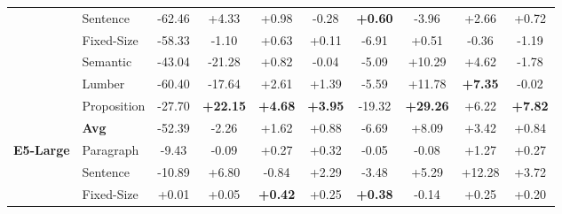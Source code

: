 \begin{table}[htbp]
\begin{tabular}{llcccccccc}
		& Sentence & \cellcolor{lightred}-62.46 & \cellcolor{lightgreen}+4.33 & \cellcolor{lightgreen}+0.98 & \cellcolor{lightred}-0.28 & \cellcolor{lightgreen}\textbf{+0.60} & \cellcolor{lightred}-3.96 & \cellcolor{lightgreen}+2.66 & \cellcolor{lightgreen}+0.72 \\
		& Fixed-Size & \cellcolor{lightred}-58.33 & \cellcolor{lightred}-1.10 & \cellcolor{lightgreen}+0.63 & \cellcolor{lightgreen}+0.11 & \cellcolor{lightred}-6.91 & \cellcolor{lightgreen}+0.51 & \cellcolor{lightred}-0.36 & \cellcolor{lightred}-1.19 \\
		& Semantic & \cellcolor{lightred}-43.04 & \cellcolor{lightred}-21.28 & \cellcolor{lightgreen}+0.82 & \cellcolor{lightred}-0.04 & \cellcolor{lightred}-5.09 & \cellcolor{lightgreen}+10.29 & \cellcolor{lightgreen}+4.62 & \cellcolor{lightred}-1.78 \\
		& Lumber & \cellcolor{lightred}-60.40 & \cellcolor{lightred}-17.64 & \cellcolor{lightgreen}+2.61 & \cellcolor{lightgreen}+1.39 & \cellcolor{lightred}-5.59 & \cellcolor{lightgreen}+11.78 & \cellcolor{lightgreen}\textbf{+7.35} & \cellcolor{lightred}-0.02 \\
		& Proposition & \cellcolor{lightred}-27.70 & \cellcolor{lightgreen}\textbf{+22.15} & \cellcolor{lightgreen}\textbf{+4.68} & \cellcolor{lightgreen}\textbf{+3.95} & \cellcolor{lightred}-19.32 & \cellcolor{lightgreen}\textbf{+29.26} & \cellcolor{lightgreen}+6.22 & \cellcolor{lightgreen}\textbf{+7.82} \\
		& \textbf{Avg} & \cellcolor{lightred}-52.39 & \cellcolor{lightred}-2.26 & \cellcolor{lightgreen}+1.62 & \cellcolor{lightgreen}+0.88 & \cellcolor{lightred}-6.69 & \cellcolor{lightgreen}+8.09 & \cellcolor{lightgreen}+3.42 & \cellcolor{lightgreen}+0.84 \\
		\midrule
		\multirow{6}{*}{\textbf{E5-Large}} & Paragraph & \cellcolor{lightred}-9.43 & \cellcolor{lightred}-0.09 & \cellcolor{lightgreen}+0.27 & \cellcolor{lightgreen}+0.32 & \cellcolor{lightred}-0.05 & \cellcolor{lightred}-0.08 & \cellcolor{lightgreen}+1.27 & \cellcolor{lightgreen}+0.27 \\
		& Sentence & \cellcolor{lightred}-10.89 & \cellcolor{lightgreen}+6.80 & \cellcolor{lightred}-0.84 & \cellcolor{lightgreen}+2.29 & \cellcolor{lightred}-3.48 & \cellcolor{lightgreen}+5.29 & \cellcolor{lightgreen}+12.28 & \cellcolor{lightgreen}+3.72 \\
		& Fixed-Size & \cellcolor{lightgreen}+0.01 & \cellcolor{lightgreen}+0.05 & \cellcolor{lightgreen}\textbf{+0.42} & \cellcolor{lightgreen}+0.25 & \cellcolor{lightgreen}\textbf{+0.38} & \cellcolor{lightred}-0.14 & \cellcolor{lightgreen}+0.25 & \cellcolor{lightgreen}+0.20 \\

\end{tabular}
\end{table}
